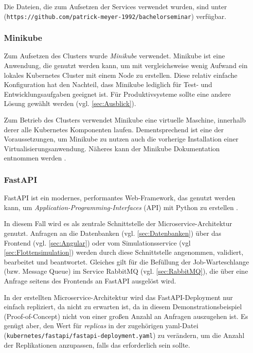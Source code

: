 \documentclass[11pt,a4paper]{article}
\begin{document}
Die Dateien, die zum Aufsetzen der Services verwendet wurden, sind unter
(\lstinline|https://github.com/patrick-meyer-1992/bachelorseminar|) \cite{Meyer_bachelorseminar}
verfügbar.

\subsubsection{Minikube}
Zum Aufsetzen des Clusters wurde \emph{Minikube} verwendet.
Minikube ist eine Anwendung, die genutzt werden kann, um mit vergleichsweise wenig Aufwand ein lokales
Kubernetes Cluster mit einem Node zu erstellen. Diese relativ einfache Konfiguration hat 
den Nachteil, dass Minikube lediglich für Test- und Entwicklungsaufgaben geeignet ist.
Für Produktivsysteme sollte eine andere Lösung gewählt werden (vgl. \ref{sec:Ausblick}). 

Zum Betrieb des Clusters verwendet Minikube eine virtuelle Maschine, innerhalb derer
alle Kubernetes Komponenten laufen. Dementsprechend ist eine der Voraussetzungen,
um Minikube zu nutzen auch die vorherige Installation einer Virtualisierungsanwendung.
Näheres kann der Minikube Dokumentation entnommen werden \cite{minikube}.

\subsubsection{FastAPI}
\label{sec:FastAPI}
FastAPI ist ein modernes, performantes Web-Framework, das genutzt werden kann, um \emph{Application-Programming-Interfaces} (API)
mit Python zu erstellen \cite{Ramirez_FastAPI}.

In diesem Fall wird es als zentrale Schnittstelle der Microservice-Architektur genutzt.
Anfragen an die Datenbanken (vgl. \ref{sec:Datenbanken})
über das Frontend (vgl. \ref{sec:Angular}) oder vom Simulationsservice (vgl \ref{sec:Flottensimulation})
werden durch diese Schnittstelle angenommen, validiert, bearbeitet und beantwortet.
Gleiches gilt für die Befüllung der Job-Warteschlange (bzw. Message Queue) im Service
RabbitMQ (vgl. \ref{sec:RabbitMQ}), die über eine Anfrage seitens des Frontends an
FastAPI ausgelöst wird.

In der erstellten Microservice-Architektur wird das FastAPI-Deployment nur einfach repliziert,
da nicht zu erwarten ist, da in diesem Demonstrationsbeispiel (Proof-of-Concept) nicht von einer
großen Anzahl an Anfragen auszugehen ist. Es genügt aber, den Wert für \emph{replicas} in der zugehörigen
yaml-Datei (\lstinline|kubernetes/fastapi/fastapi-deployment.yaml|) zu verändern, um die Anzahl der Replikationen anzupassen, 
falls das erforderlich sein sollte.
\end{document}
